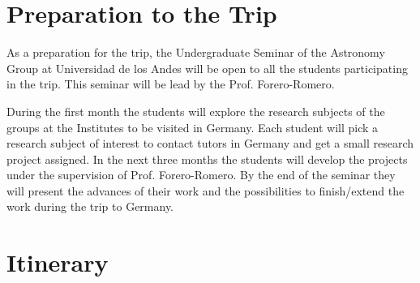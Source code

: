 \documentclass[12pt]{article}
\begin{document}
\section{Preparation to the Trip}
\label{sec:preparation}

As a preparation for the trip, the Undergraduate Seminar of the Astronomy
Group at Universidad de los Andes will be open to all the students
participating in the trip. This seminar will be lead by the
Prof. Forero-Romero.  

During the first month the students will explore the research subjects of the groups at  the Institutes to be visited in Germany. Each student will pick a
  research subject of interest to contact tutors in Germany and get a
  small research project assigned.  In the next three months the
  students will develop the projects under the supervision of
  Prof. Forero-Romero. By the end of the seminar they will present the
  advances of their work and the possibilities to finish/extend the
  work during the trip to Germany.



\section{Itinerary}
\end{document}
